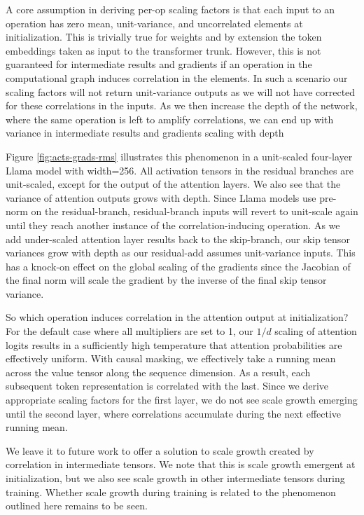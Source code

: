 A core assumption in deriving per-op scaling factors is that each input to an operation has zero mean, unit-variance, and uncorrelated elements at initialization. This is trivially true for weights and by extension the token embeddings taken as input to the transformer trunk. However, this is not guaranteed for intermediate results and gradients if an operation in the computational graph induces correlation in the elements. In such a scenario our scaling factors will not return unit-variance outputs as we will not have corrected for these correlations in the inputs. As we then increase the depth of the network, where the same operation is left to amplify correlations, we can end up with variance in intermediate results and gradients scaling with depth

Figure \ref{fig:acts-grads-rms} illustrates this phenomenon in a unit-scaled four-layer Llama model with width=256. All activation tensors in the residual branches are unit-scaled, except for the output of the attention layers. We also see that the variance of attention outputs grows with depth. Since Llama models use pre-norm on the residual-branch, residual-branch inputs will revert to unit-scale again until they reach another instance of the correlation-inducing operation. As we add under-scaled attention layer results back to the skip-branch, our skip tensor variances grow with depth as our residual-add assumes unit-variance inputs. This has a knock-on effect on the global scaling of the gradients since the Jacobian of the final norm will scale the gradient by the inverse of the final skip tensor variance.

So which operation induces correlation in the attention output at initialization? For the default case where all multipliers are set to 1, our $1/d$ scaling of attention logits results in a sufficiently high temperature that attention probabilities are effectively uniform. With causal masking, we effectively take a running mean across the value tensor along the sequence dimension. As a result, each subsequent token representation is correlated with the last. Since we derive appropriate scaling factors for the first layer, we do not see scale growth emerging until the second layer, where correlations accumulate during the next effective running mean.

We leave it to future work to offer a solution to scale growth created by correlation in intermediate tensors. We note that this is scale growth emergent at initialization, but we also see scale growth in other intermediate tensors during training. Whether scale growth during training is related to the phenomenon outlined here remains to be seen.